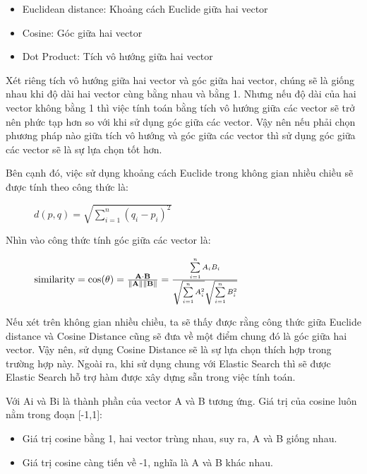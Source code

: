 \begin{itemize}
	\item Euclidean distance: Khoảng cách Euclide giữa hai vector
	\item Cosine: Góc giữa hai vector
	\item Dot Product: Tích vô hướng giữa hai vector
\end{itemize}

Xét riêng tích vô hướng giữa hai vector và góc giữa hai vector, chúng sẽ là giống nhau khi độ dài hai vector cùng bằng nhau và bằng 1. Nhưng nếu độ dài của hai vector không bằng 1 thì việc tính toán bằng tích vô hướng giữa các vector sẽ trở nên phức tạp hơn so với khi sử dụng góc giữa các vector. Vậy nên nếu phải chọn phương pháp nào giữa tích vô hướng và góc giữa các vector thì sử dụng góc giữa các vector sẽ là sự lựa chọn tốt hơn.

Bên cạnh đó, việc sử dụng khoảng cách Euclide trong không gian nhiều chiều sẽ được tính theo công thức là:
\begin{figure}[htp]
	\centering
	$d\left( p,q\right)   = \sqrt {\sum _{i=1}^{n}  \left( q_{i}-p_{i}\right)^2 }$
\end{figure}

Nhìn vào công thức tính góc giữa các vector là:

\begin{figure}[htp]
	\centering
	$\text{similarity}=\cos(\theta )={\mathbf {A} \cdot \mathbf {B}  \over \|\mathbf {A} \|\|\mathbf {B} \|}={\frac {\sum \limits _{i=1}^{n}{A_{i}B_{i}}}{{\sqrt {\sum \limits _{i=1}^{n}{A_{i}^{2}}}}{\sqrt {\sum \limits _{i=1}^{n}{B_{i}^{2}}}}}} $
\end{figure}

Nếu xét trên không gian nhiều chiều, ta sẽ thấy được rằng công thức giữa Euclide distance và Cosine Distance cũng sẽ đưa về một điểm chung đó là góc giữa hai vector. Vậy nên, sử dụng Cosine Distance sẽ là sự lựa chọn thích hợp trong trường hợp này. Ngoài ra, khi sử dụng chung với Elastic Search thì sẽ được Elastic Search hỗ trợ hàm được xây dựng sẵn trong việc tính toán.

Với Ai và Bi là thành phần của vector A và B tương ứng. Giá trị của cosine luôn nằm trong đoạn [-1,1]:
\begin{itemize}
	\item Giá trị cosine bằng 1, hai vector trùng nhau, suy ra, A và B giống nhau.
	\item Giá trị cosine càng tiến về -1, nghĩa là A và B khác nhau.
\end{itemize}

